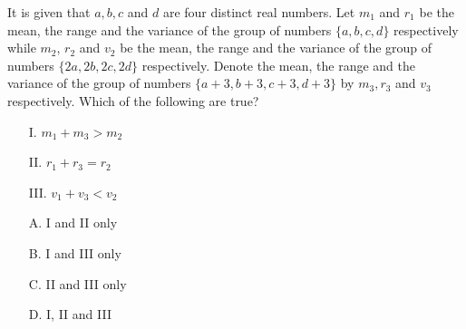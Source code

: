 
It is given that $a, b, c$ and $d$ are four distinct real numbers. Let $m_1$ and $r_1$ be the mean, the range and the variance of the group of numbers $\{a, b, c, d\}$ respectively while $m_2$, $r_2$ and $v_2$ be the mean, the range and the variance of the group of numbers $\{2a, 2b, 2c, 2d\}$ respectively. Denote the mean, the range and the variance of the group of numbers $\{a+3, b+3, c+3, d+3\}$ by $m_3, r_3$ and $v_3$ respectively. Which of the following are true?
    \begin{itemize}
        \item[I.] $m_1+m_3>m_2$
        \item[II.] $r_1+r_3=r_2$
        \item[III.] $v_1+v_3<v_2$
    \end{itemize}
    \begin{itemize}
        \item[A.] I and II only
        \item[B.] I and III only
        \item[C.] II and III only
        \item[D.] I, II and III
    \end{itemize}

